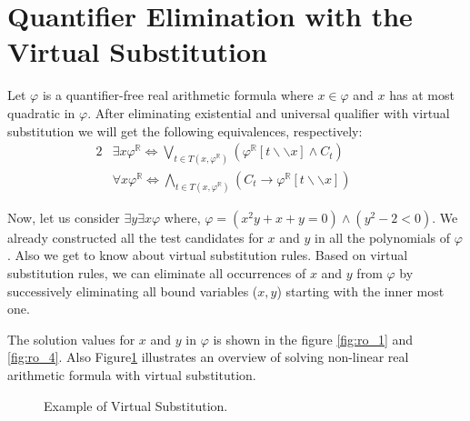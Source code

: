 \section{Quantifier Elimination with the Virtual Substitution}
\label{sec:quantifier-elimination-with-the-virtual-substitution}
Let $\varphi$ is a quantifier-free real arithmetic formula where $x\in \varphi$ and $x$ has at most quadratic in $\varphi$. After eliminating existential and universal qualifier with virtual substitution we will get the following equivalences, respectively:
\begin{alignat}{2}
	&\exists x \varphi^\mathbb{R} \Longleftrightarrow \bigvee\limits_{t\in T(x,\varphi^\mathbb{R})}  (\varphi^\mathbb{R} [t\backslash\backslash x] \wedge C_t)\qquad   \\
	& \forall x \varphi^\mathbb{R} \Longleftrightarrow \bigwedge\limits_{t\in T(x,\varphi^\mathbb{R})}  (C_{t}\rightarrow\varphi^\mathbb{R} [t\backslash\backslash x] )\qquad
\end{alignat}

Now, let us consider $\exists y\exists x\varphi$ where, $\varphi = (x^{2}y + x + y = 0) \wedge (y^{2} -2 < 0)$. We already constructed all the test candidates for $x$ and $y$ in all the polynomials of $\varphi$. Also we get to know about virtual substitution rules. Based on virtual substitution rules, we can eliminate all occurrences of $x$ and $y$ from $\varphi$ by successively eliminating all bound variables ($x,y$) starting with the inner most one.
\begin{center}
	
\end{center}
The solution values for $x$ and $y$ in $\varphi$ is shown in the figure \ref{fig:ro_1} and \ref{fig:ro_4}. Also Figure\ref{fig:graph} illustrates an overview of solving non-linear real arithmetic formula with virtual substitution.
\begin{figure}[htb] %
	\begin{center}
	
	\end{center}
	\caption{Example of Virtual Substitution.}
	\label{fig:graph}
\end{figure}

